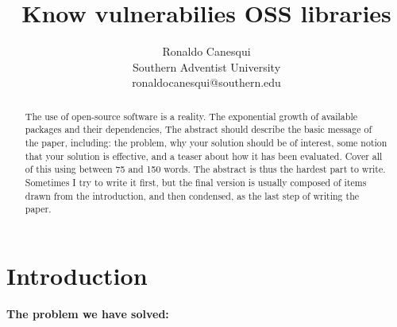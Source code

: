 \documentclass[pdf,bookmarks,colorlinks=true]{IEEEtran}
\title{\bf Know vulnerabilies OSS libraries}
\author{Ronaldo Canesqui\\
Southern Adventist University\\
ronaldocanesqui@southern.edu
}
\begin{document}
\maketitle

\begin{abstract}

The use of open-source software is a reality. The exponential growth of available packages and their dependencies, 
The abstract should describe the basic message of the paper, including: the
problem, why your solution should be of interest, some notion that your
solution is effective, and a teaser about how it has been evaluated. Cover all
of this using between 75 and 150 words. The abstract is thus the hardest part
to write. Sometimes I try to write it first, but the final version is usually
composed of items drawn from the introduction, and then condensed, as the last
step of writing the paper.

\end{abstract}



\section{Introduction}
\label{sec:Introduction}

\textbf{The problem we have solved:}
\end{document}
